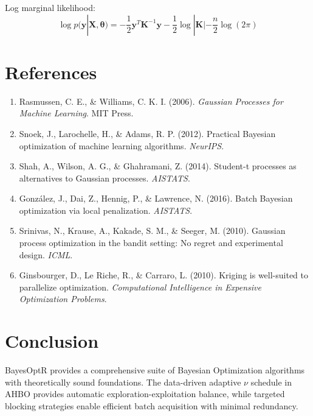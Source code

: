 \documentclass[11pt,a4paper]{article}
\begin{document}
Log marginal likelihood:
\begin{equation}
    \log p(\mathbf{y} | \mathbf{X}, \boldsymbol{\theta}) = -\frac{1}{2}\mathbf{y}^T\mathbf{K}^{-1}\mathbf{y} - \frac{1}{2}\log|\mathbf{K}| - \frac{n}{2}\log(2\pi)
\end{equation}

\section{References}

\begin{enumerate}
    \item Rasmussen, C. E., \& Williams, C. K. I. (2006). \textit{Gaussian Processes for Machine Learning}. MIT Press.
    \item Snoek, J., Larochelle, H., \& Adams, R. P. (2012). Practical Bayesian optimization of machine learning algorithms. \textit{NeurIPS}.
    \item Shah, A., Wilson, A. G., \& Ghahramani, Z. (2014). Student-t processes as alternatives to Gaussian processes. \textit{AISTATS}.
    \item González, J., Dai, Z., Hennig, P., \& Lawrence, N. (2016). Batch Bayesian optimization via local penalization. \textit{AISTATS}.
    \item Srinivas, N., Krause, A., Kakade, S. M., \& Seeger, M. (2010). Gaussian process optimization in the bandit setting: No regret and experimental design. \textit{ICML}.
    \item Ginsbourger, D., Le Riche, R., \& Carraro, L. (2010). Kriging is well-suited to parallelize optimization. \textit{Computational Intelligence in Expensive Optimization Problems}.
\end{enumerate}

\section{Conclusion}

BayesOptR provides a comprehensive suite of Bayesian Optimization algorithms with theoretically sound foundations. The data-driven adaptive $\nu$ schedule in AHBO provides automatic exploration-exploitation balance, while targeted blocking strategies enable efficient batch acquisition with minimal redundancy.
\end{document}
